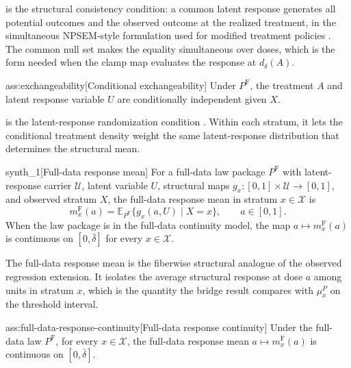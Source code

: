  is the structural consistency condition: a common latent response generates all potential outcomes and the observed outcome at the realized treatment, in the simultaneous NPSEM-style formulation used for modified treatment policies \citep{DiazWilliamsHoffmanSchenck2023}. The common null set makes the equality simultaneous over doses, which is the form needed when the clamp map evaluates the response at \(d_\delta(A)\).

\begin{assumptionv}{ass:exchangeability}[Conditional exchangeability]
Under \(P^{\mathrm F}\), the treatment \(A\) and latent response variable \(U\) are conditionally independent given \(X\).
\end{assumptionv}

 is the latent-response randomization condition \citep{DiazWilliamsHoffmanSchenck2023}. Within each stratum, it lets the conditional treatment density weight the same latent-response distribution that determines the structural mean.

\begin{definitionv}{synth_1}[Full-data response mean]
For a full-data law package \(P^{\mathrm F}\) with latent-response carrier \(\mathcal U\), latent variable \(U\), structural maps \(g_x:[0,1]\times\mathcal U\to[0,1]\), and observed stratum \(X\), the full-data response mean in stratum \(x\in\mathcal X\) is
\[
  m_x^{\mathrm F}(a)=\mathbb E_{P^{\mathrm F}}\{g_x(a,U)\mid X=x\},\qquad a\in[0,1].
\]
When the law package is in the full-data continuity model, the map \(a\mapsto m_x^{\mathrm F}(a)\) is continuous on \([0,\bar\delta]\) for every \(x\in\mathcal X\).
\end{definitionv}

The full-data response mean  is the fiberwise structural analogue of the observed regression extension. It isolates the average structural response at dose \(a\) among units in stratum \(x\), which is the quantity the bridge result compares with \(\mu_x^P\) on the threshold interval.

\begin{assumptionv}{ass:full-data-response-continuity}[Full-data response continuity]
Under the full-data law \(P^{\mathrm F}\), for every \(x\in\mathcal X\), the full-data response mean \(a\mapsto m_x^{\mathrm F}(a)\) is continuous on \([0,\bar\delta]\).
\end{assumptionv}

